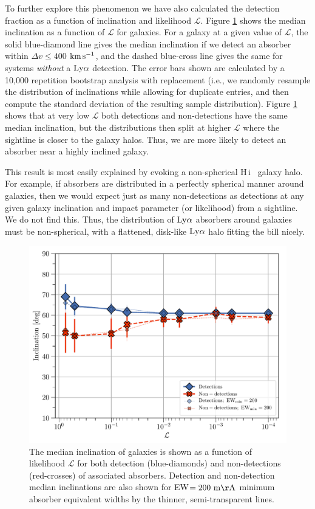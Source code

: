 \documentclass[twocolumn,tighten]{aastex62}
\newcommand{\kms}{$\rm km\, s^{-1}$}
\newcommand{\HI}{\mbox{H\,{\sc i}} }
\begin{document}
To further explore this phenomenon we have also calculated the detection fraction as a function of inclination and likelihood $\mathcal{L}$. Figure \ref{detection_fraction_inc} shows the median inclination as a function of $\mathcal{L}$ for galaxies. For a galaxy at a given value of $\mathcal{L}$, the solid blue-diamond line gives the median inclination if we detect an absorber within $\Delta v \leq 400$ \kms, and the dashed blue-cross line gives the same for systems \emph{without} a $\rm Ly\alpha$ detection. The error bars shown are calculated by a 10,000 repetition bootstrap analysis with replacement (i.e., we randomly resample the distribution of inclinations while allowing for duplicate entries, and then compute the standard deviation of the resulting sample distribution). Figure \ref{detection_fraction_inc} shows that at very low $\mathcal{L}$ both detections and non-detections have the same median inclination, but the distributions then split at higher $\mathcal{L}$ where the sightline is closer to the galaxy halos. Thus, we are more likely to detect an absorber near a highly inclined galaxy. 

This result is most easily explained by evoking a non-spherical \HI~galaxy halo. For example, if absorbers are distributed in a perfectly spherical manner around galaxies, then we would expect just as many non-detections as detections at any given galaxy inclination and impact parameter (or likelihood) from a sightline. We do not find this. Thus, the distribution of $\rm Ly\alpha$ absorbers around galaxies must be non-spherical, with a flattened, disk-like $\rm Ly\alpha$ halo fitting the bill nicely.

\begin{figure}
\centering
  \includegraphics[width=0.99\linewidth]{detection_fraction_like_inc_errors_minEW0_200.pdf}
  \caption{\small{The median inclination of galaxies is shown as a function of likelihood $\mathcal{L}$ for both detection (blue-diamonds) and non-detections (red-crosses) of associated absorbers. Detection and non-detection median inclinations are also shown for EW$\rm = 200~ m\AA$ minimum absorber equivalent widths by the thinner, semi-transparent lines.}}
\label{detection_fraction_inc}
\vspace{0pt}
\end{figure}
\end{document}
